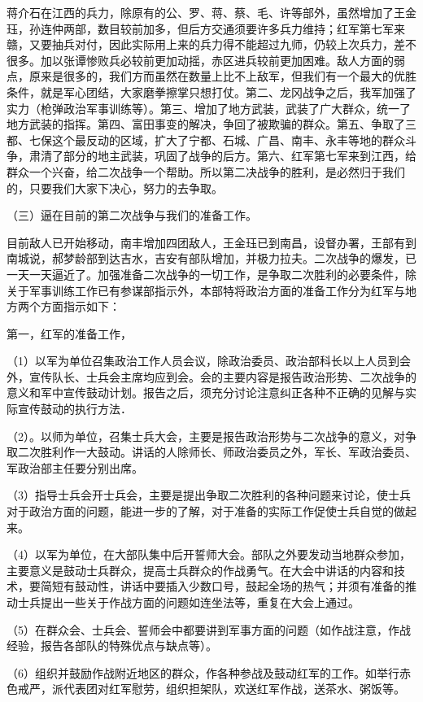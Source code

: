 蒋介石在江西的兵力，除原有的公、罗、蒋、蔡、毛、许等部外，虽然增加了王金珏，孙连仲两部，数目较前加多，但后方交通须要许多兵力维持；红军第七军来赣，又要抽兵对付，因此实际用上来的兵力得不能超过九师，仍较上次兵力，差不很多。加以张谭惨败兵必较前更加动摇，赤区进兵较前更加困难。敌人方面的弱点，原来是很多的，我们方而虽然在数量上比不上敌军，但我们有一个最大的优胜条件，就是军心团结，大家磨拳擦掌只想打仗。第二、龙冈战争之后，我军加强了实力（枪弹政治军事训练等）。第三、增加了地方武装，武装了广大群众，统一了地方武装的指挥。第四、富田事变的解决，争回了被欺骗的群众。第五、争取了三都、七保这个最反动的区域，扩大了宁都、石城、广昌、南丰、永丰等地的群众斗争，肃清了部分的地主武装，巩固了战争的后方。第六、红军第七军来到江西，给群众一个兴奋，给二次战争一个帮助。所以第二决战争的胜利，是必然归于我们的，只要我们大家下决心，努力的去争取。

（三）逼在目前的第二次战争与我们的准备工作。

目前敌人已开始移动，南丰增加四团敌人，王金珏已到南昌，设督办署，王部有到南城说，郝梦龄部到达吉水，吉安有部队增加，并极力拉夫。二次战争的爆发，已一天一天逼近了。加强准备二次战争的一切工作，是争取二次胜利的必要条件，除关于军事训练工作已有参谋部指示外，本部特将政治方面的准备工作分为红军与地方两个方面指示如下：

第一，红军的准备工作，

（1）以军为单位召集政治工作人员会议，除政治委员、政治部科长以上人员到会外，宣传队长、士兵会主席均应到会。会的主要内容是报告政治形势、二次战争的意义和军中宣传鼓动计划。报告之后，须充分讨论注意纠正各种不正确的见解与实际宣传鼓动的执行方法．

（2）。以师为单位，召集士兵大会，主要是报告政治形势与二次战争的意义，对争取二次胜利作一大鼓动。讲话的人除师长、师政治委员之外，军长、军政治委员、军政治部主任要分别出席。

（3）指导士兵会开士兵会，主要是提出争取二次胜利的各种问题来讨论，使士兵对于政治方面的问题，能进一步的了解，对于准备的实际工作促使士兵自觉的做起来。

（4）以军为单位，在大部队集中后开誓师大会。部队之外要发动当地群众参加，主要意义是鼓动士兵群众，提高士兵群众的作战勇气。在大会中讲话的内容和技术，要简短有鼓动性，讲话中要插入少数口号，鼓起全场的热气；并须有准备的推动士兵提出一些关于作战方面的问题如连坐法等，重复在大会上通过。

（5）在群众会、士兵会、誓师会中都要讲到军事方面的问题（如作战注意，作战经验，报告各部队的特殊优点与缺点等）。

（6）组织并鼓励作战附近地区的群众，作各种参战及鼓动红军的工作。如举行赤色戒严，派代表团对红军慰劳，组织担架队，欢送红军作战，送茶水、粥饭等。

